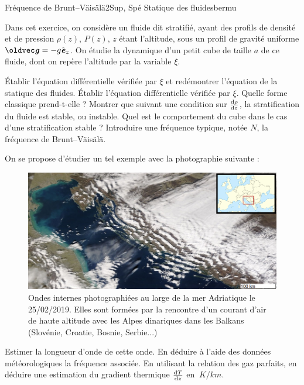 
\begin{exercise}{Fréquence de Brunt--Väisälä}{2}{Sup, Spé}
{Statique des fluides}{bermu}

Dans cet exercice, on considère un fluide dit stratifié, ayant des profils de densité et de pression $\rho(z)$, $P(z)$, $z$ étant l'altitude, sous un profil de gravité uniforme $\vec{g} = -g\ve_z$. On étudie la dynamique d'un petit cube de taille $a$ de ce fluide, dont on repère l'altitude par la variable $\xi$.

\begin{questions}
    \questioncours \'Etablir l'équation différentielle vérifiée par $\xi$ et redémontrer l'équation de la statique des fluides. 
    \question \'Etablir l'équation différentielle vérifiée par $\xi$. Quelle forme classique prend-t-elle ? Montrer que suivant une condition sur $\dv{\rho}{z}$, la stratification du fluide est stable, ou instable.
    \question Quel est le comportement du cube dans le cas d'une stratification stable ? Introduire une fréquence typique, notée $N$, la fréquence de Brunt--Väisälä. 
    \begin{EnvUplevel} On se propose d'étudier un tel exemple avec la photographie suivante :
    \begin{figure}[H]
        \centering
        \includegraphics[width=\linewidth]{mecaflu/statiqueflu/gravity_waves.png}
        \caption{Ondes internes photographiées au large de la mer Adriatique le 25/02/2019. \newline Elles sont formées par la rencontre d'un courant d'air de haute altitude avec les Alpes dinariques dans les Balkans (Slovénie, Croatie, Bosnie, Serbie...)}
    \end{figure}
    \end{EnvUplevel}
    \question Estimer la longueur d'onde de cette onde. En déduire à l'aide des données météorologiques la fréquence associée.
    \question En utilisant la relation des gaz parfaits, en déduire une estimation du gradient thermique $\dv{T}{z}$ en $\SI{}{K/km}$.
\end{questions}


\end{exercise}
